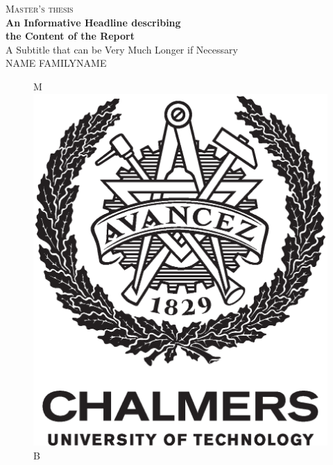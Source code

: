 \newpage
\restoregeometry
\thispagestyle{empty}
\mbox{}


\newpage
\thispagestyle{empty}
\begin{center}
	\textsc{\large Master's thesis \the\year}\\[4cm]
	\textbf{\Large An Informative Headline describing\\ the Content of the Report} \\[1cm]
	{\large A Subtitle that can be Very Much Longer if Necessary}\\[1cm]
	{\large NAME FAMILYNAME}
	
	\vfill	
	\begin{figure}[H]
	\centering
	\if\ThesisType M
    \includegraphics[width=0.2\pdfpagewidth]{figure/auxiliary/AvancezChalmersU_black_centered.eps} \\
    \fi
    \if\ThesisType B

\end{figure}
\end{center}
